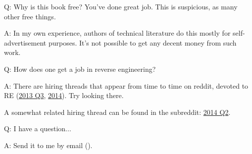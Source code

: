 \par Q: Why is this book free? You've done great job. This is suspicious, as many other free things.
\par A: In my own experience, authors of technical literature do this mostly for self-advertisement purposes. It's not possible to get any decent money from such work.

\par Q: How does one get a job in reverse engineering?
\par A: There are hiring threads that appear from time to time on reddit, devoted to RE\FNURLREDDIT{}
(\href{http://go.yurichev.com/17333}{2013 Q3}, 
\href{http://go.yurichev.com/17334}{2014}).
Try looking there.

A somewhat related hiring thread can be found in the  subreddit:
\href{http://go.yurichev.com/17335}{2014 Q2}.

\par Q: I have a question...
\par A: Send it to me by email (\EMAIL).

